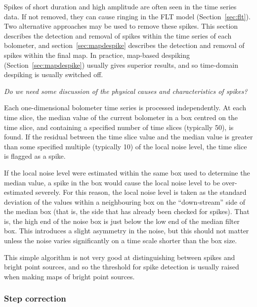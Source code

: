 \documentclass[useAMS,usenatbib,nofootinbib]{mn2e}
\begin{document}
Spikes of short duration and high amplitude are often seen in the time
series data. If not removed, they can cause ringing in the FLT model
(Section~\ref{sec:flt}). Two alternative approaches may be used to remove
these spikes. This section describes the detection and removal of spikes
within the time series of each bolometer, and
section~\ref{sec:mapdespike} describes the detection and removal of
spikes within the final map. In practice, map-based despiking
(Section~\ref{sec:mapdespike}) usually gives superior results, and so
time-domain despiking is usually switched off.

\emph{Do we need some discussion of the physical causes and
characteristics of spikes?}

Each one-dimensional bolometer time series is processed independently. At
each time slice, the median value of the current bolometer in a box
centred on the time slice, and containing a specified number of time
slices (typically 50), is found. If the residual between the
time slice value and the median value is greater than some specified
multiple (typically 10) of the local noise level, the time slice is
flagged as a spike.

If the local noise level were estimated within the same box used to
determine the median value, a spike in the box would cause the local
noise level to be over-estimated severely. For this reason, the local
noise level is taken as the standard deviation of the values within a
neighbouring box on the ``down-stream'' side of the median box (that is,
the side that has already been checked for spikes). That is, the high end
of the noise box is just below the low end of the median filter box. This
introduces a slight asymmetry in the noise, but this should not matter
unless the noise varies significantly on a time scale shorter than the
box size.

This simple algorithm is not very good at distinguishing between spikes
and bright point sources, and so the threshold for spike detection is
usually raised when making maps of bright point sources.

\subsubsection{Step correction}
\label{sec:steps}
\end{document}
